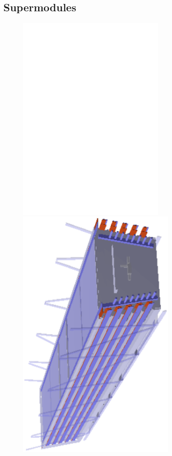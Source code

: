 \documentclass{alicetdr}
\begin{document}
\subsection{Supermodules}
\label{GEO:smframes}
%
\begin{figure}[htb]
\begin{center}
\begin{minipage}[b]{0.49\textwidth}
\begin{center}
\includegraphics[width=0.65\textwidth,angle=270]{plots/geo_smframe.eps}
\end{center}
\end{minipage}
\begin{minipage}[b]{0.49\textwidth}
\begin{center}
\includegraphics[width=0.70\textwidth,angle=270]{plots/geo_sm.eps}

\end{center}
\end{minipage}
\end{center}
\end{figure}
\end{document}
